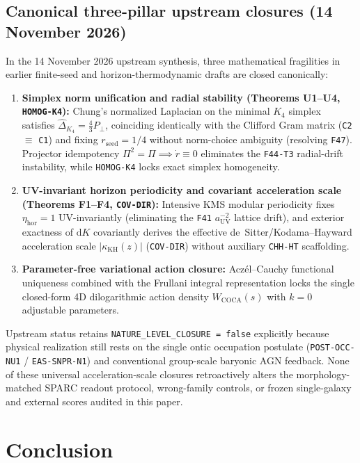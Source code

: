 \documentclass[11pt]{article}
\begin{document}
\subsection{Canonical three-pillar upstream closures (14 November 2026)}
\label{sec:three-pillar-closures-20261114}
In the 14 November 2026 upstream synthesis, three mathematical fragilities in
earlier finite-seed and horizon-thermodynamic drafts are closed canonically:
\begin{enumerate}[leftmargin=*]
\item \textbf{Simplex norm unification and radial stability (Theorems U1--U4, \texttt{HOMOG-K4}):}
Chung's normalized Laplacian on the minimal $K_4$ simplex satisfies
$\widehat{\Delta}_{K_4}=\frac{4}{3}P_\perp$, coinciding identically with the
Clifford Gram matrix (\texttt{C2} $\equiv$ \texttt{C1}) and fixing
$r_{\mathrm{seed}}=1/4$ without norm-choice ambiguity (resolving \texttt{F47}).
Projector idempotency $\Pi^2=\Pi\implies\dot{r}\equiv 0$ eliminates the
\texttt{F44-T3} radial-drift instability, while \texttt{HOMOG-K4} locks exact
simplex homogeneity.
\item \textbf{UV-invariant horizon periodicity and covariant acceleration scale (Theorems F1--F4, \texttt{COV-DIR}):}
Intensive KMS modular periodicity fixes $\eta_{\mathrm{hor}}=1$
UV-invariantly (eliminating the \texttt{F41} $a_{\mathrm{UV}}^{-2}$ lattice
drift), and exterior exactness of $\mathrm{d}K$ covariantly derives the
effective de~Sitter/Kodama--Hayward acceleration scale
$|\kappa_{\mathrm{KH}}(z)|$ (\texttt{COV-DIR}) without auxiliary
\texttt{CHH-HT} scaffolding.
\item \textbf{Parameter-free variational action closure:}
Acz\'el--Cauchy functional uniqueness combined with the Frullani integral
representation locks the single closed-form 4D dilogarithmic action density
$W_{\mathrm{COCA}}(s)$ with $k=0$ adjustable parameters.
\end{enumerate}
Upstream status retains \texttt{NATURE\_LEVEL\_CLOSURE = false} explicitly
because physical realization still rests on the single ontic occupation
postulate (\texttt{POST-OCC-NU1} / \texttt{EAS-SNPR-N1}) and conventional
group-scale baryonic AGN feedback. None of these universal acceleration-scale
closures retroactively alters the morphology-matched SPARC readout protocol,
wrong-family controls, or frozen single-galaxy and external scores audited in
this paper.

\section{Conclusion}
\end{document}
